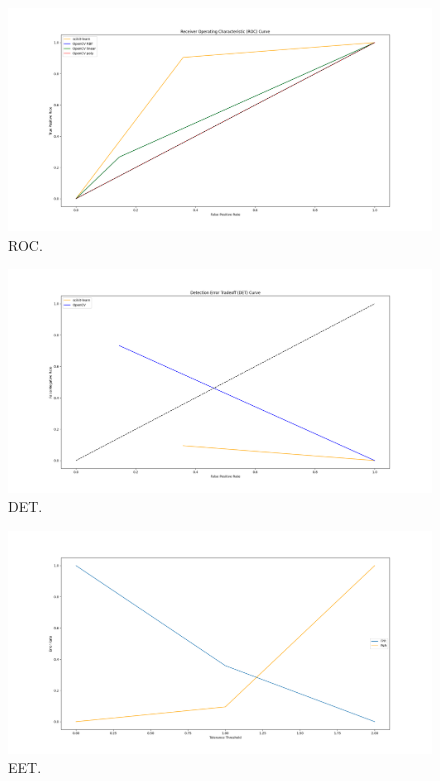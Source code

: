 \begin{figure}[h!t]
    \centering
    \includegraphics[scale=0.25]{images/roc.png}
    \caption{ROC.}
    \label{fig:roc}
\end{figure}

\begin{figure}[h!t]
    \centering
    \includegraphics[scale=0.25]{images/det.png}
    \caption{DET.}
    \label{fig:det}
\end{figure}


\begin{figure}[h!t]
    \centering
    \includegraphics[scale=0.25]{images/eet.png}
    \caption{EET.}
    \label{fig:eet}
\end{figure}
